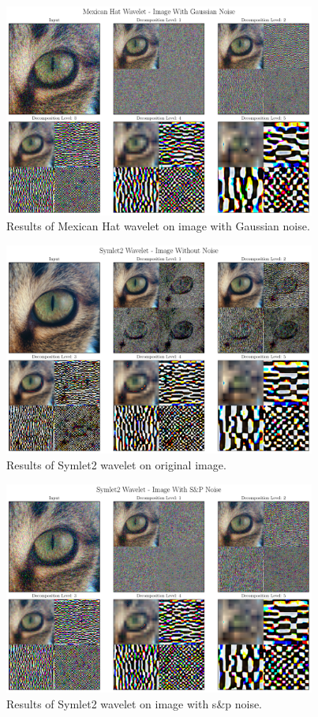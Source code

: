 \documentclass[12pt]{article}
\begin{document}
	\begin{figure}[!h]
		\centering
		\includegraphics[height=7cm]{../Tests/Outputs/2D_MexicanHatWavelet_GaussianNoise.pdf}
		\caption{Results of Mexican Hat wavelet on image with Gaussian noise.}
		\label{fig:2d_mh_gs}
	\end{figure}
	
	\begin{figure}[!h]
		\centering
		\includegraphics[height=7cm]{../Tests/Outputs/2D_Symlet2Wavelet_WithoutNoise.pdf}
		\caption{Results of Symlet2 wavelet on original image.}
		\label{fig:2d_sym2}
	\end{figure}
	
	\begin{figure}[!h]
		\centering
		\includegraphics[height=7cm]{../Tests/Outputs/2D_Symlet2Wavelet_SPNoise.pdf}
		\caption{Results of Symlet2 wavelet on image with s\&p noise.}
		\label{fig:2d_sym2_sp}
	\end{figure}
	
\end{document}
